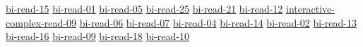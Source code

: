 \hyperref[sec:bi-read-15]{bi-read-15}
\hyperref[sec:bi-read-01]{bi-read-01}
\hyperref[sec:bi-read-05]{bi-read-05}
\hyperref[sec:bi-read-25]{bi-read-25}
\hyperref[sec:bi-read-21]{bi-read-21}
\hyperref[sec:bi-read-12]{bi-read-12}
\hyperref[sec:interactive-complex-read-09]{interactive-complex-read-09}
\hyperref[sec:bi-read-06]{bi-read-06}
\hyperref[sec:bi-read-07]{bi-read-07}
\hyperref[sec:bi-read-04]{bi-read-04}
\hyperref[sec:bi-read-14]{bi-read-14}
\hyperref[sec:bi-read-02]{bi-read-02}
\hyperref[sec:bi-read-13]{bi-read-13}
\hyperref[sec:bi-read-16]{bi-read-16}
\hyperref[sec:bi-read-09]{bi-read-09}
\hyperref[sec:bi-read-18]{bi-read-18}
\hyperref[sec:bi-read-10]{bi-read-10}
